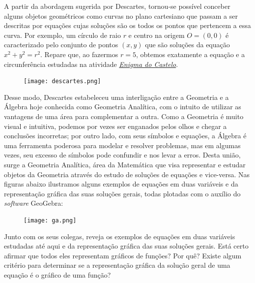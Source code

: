  A partir da abordagem sugerida por Descartes, tornou-se possível conceber alguns objetos geométricos como curvas no plano cartesiano que passam a ser descritas por equações cujas soluções são os todos os pontos que pertencem a essa curva. Por exemplo, um círculo de raio $r$ e centro na origem $O = (0,0)$ é caracterizado pelo conjunto de pontos $(x,y)$ que são soluções da equação $x^2+y^2 = r^2$. Repare que, ao fazermos $r =5$, obtemos exatamente a equação e a circunferência estudadas na atividade \hyperref[castelo]{\textit{Enigma do Castelo}}.

\begin{figure}[H]
\centering

\noindent\texttt{[image: descartes.png]}
\end{figure}

Desse modo, Descartes estabeleceu uma interligação entre a Geometria e a Álgebra hoje conhecida como Geometria Analítica, com o intuito de utilizar as vantagens de uma área para complementar a outra. Como a Geometria é muito visual e intuitiva, podemos por vezes ser enganados pelos olhos e chegar a conclusões incorretas; por outro lado, com seus símbolos e equações, a Álgebra é uma ferramenta poderosa para modelar e resolver problemas, mas em algumas vezes, seu excesso de símbolos pode confundir e nos levar a erros. Desta união, surge a Geometria Analítica, área da Matemática que visa representar e estudar objetos da Geometria através do estudo de soluções de equações e vice-versa.
Nas figuras abaixo ilustramos alguns exemplos de equações em duas variáveis e da representação gráfica das suas soluções gerais, todas plotadas com o auxílio do \emph{software} GeoGebra:

\begin{figure}[H]
\centering

\noindent\texttt{[image: ga.png]}
\end{figure}


\begin{reflection}

Junto com os seus colegas, reveja os exemplos de equações em duas variáveis estudadas até aqui e da representação gráfica das suas soluções gerais. Está certo afirmar que todos eles representam gráficos de funções? Por quê? Existe algum critério para determinar se a representação gráfica da solução geral de uma equação é o gráfico de uma função?

\end{reflection}


